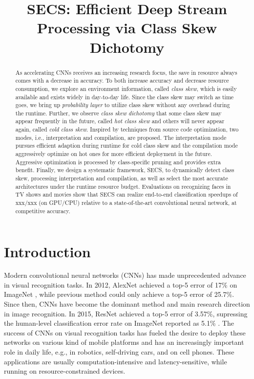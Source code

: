 \documentclass[pageno]{jpaper}
\begin{document}
\title{SECS: Efficient Deep Stream Processing via Class Skew Dichotomy}
\author{}
\date{}
\maketitle


\begin{abstract}
As accelerating CNNs receives an increasing research focus, the save in resource always comes with a decrease in accuracy. To both increase accuracy and decrease resource consumption, we explore an environment information, called \textit{class skew}, which is easily available and exists widely in day-to-day life. Since the class skew may switch as time goes, we bring up \textit{probability layer} to utilize class skew without any overhead during the runtime. Further, we observe \textit{class skew dichotomy} that some class skew may appear frequently in the future, called \textit{hot class skew} and others will never appear again, called \textit{cold class skew}. Inspired by techniques from source code optimization, two modes, i.e., interpretation and compilation, are proposed. The interpretation mode pursues efficient adaption during runtime for cold class skew and the compilation mode aggressively optimize on hot ones for more efficient deployment in the future. Aggressive optimization is processed by class-specific pruning and provides extra benefit. Finally, we design a systematic framework, SECS, to dynamically detect class skew, processing interpretation and compilation, as well as select the most accurate architectures under the runtime resource budget. Evaluations on recognizing faces in TV shows and movies show that SECS can realize end-to-end classification speedups of xxx/xxx (on GPU/CPU) relative to a state-of-the-art convolutional neural network, at competitive accuracy.
\end{abstract}




\section{Introduction}
Modern convolutional neural networks (CNNs) has made unprecedented advance in visual recognition tasks. In 2012, AlexNet \cite{krizhevsky2012imagenet} achieved a top-5 error of 17\% on ImageNet \cite{deng2009imagenet}, while previous method could only achieve a top-5 error of 25.7\%. Since then, CNNs have become the dominant method and main research direction in image recognition. In 2015, ResNet \cite{he2016deep} achieved a top-5 error of 3.57\%, supressing the human-level classification error rate on ImageNet reported as 5.1\% \cite{russakovsky2015imagenet}. The success of CNNs on visual recognition tasks has fueled the desire to deploy these networks on various kind of mobile platforms and has an increasingly important role in daily life, e.g., in robotics, self-driving cars, and on cell phones. These applications are usually computation-intensive and latency-sensitive, while running on resource-constrained devices. 
\end{document}
